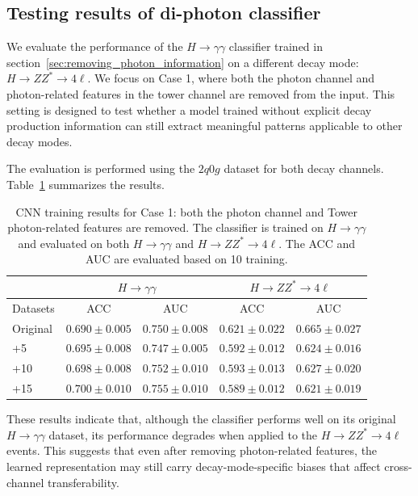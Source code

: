 \documentclass[12pt]{article}
\begin{document}
    \subsection{Testing results of di-photon classifier}%
    \label{sub:testing_results_of_di_photon_classifier}
        We evaluate the performance of the $H \to \gamma\gamma$ classifier trained in section~\ref{sec:removing_photon_information} on a different decay mode: $H \to ZZ^* \to 4\ell$. We focus on Case 1, where both the photon channel and photon-related features in the tower channel are removed from the input. This setting is designed to test whether a model trained without explicit decay production information can still extract meaningful patterns applicable to other decay modes.

        The evaluation is performed using the $2q0g$ dataset for both decay channels. Table~\ref{tab:CWoLa_CNN_training_results_3000_jet_tagging_eta_phi_aug_5_10_15_remove_photon_ZZ4l} summarizes the results.
        \begin{table}[htpb]
            \centering
            \caption{CNN training results for Case 1: both the photon channel and Tower photon-related features are removed. The classifier is trained on $H \to \gamma\gamma$ and evaluated on both $H \to \gamma\gamma$ and $H \to ZZ^* \to 4\ell$. The ACC and AUC are evaluated based on 10 training.}
            \label{tab:CWoLa_CNN_training_results_3000_jet_tagging_eta_phi_aug_5_10_15_remove_photon_ZZ4l}
            \begin{tabular}{l|cc|cc}
                         & \multicolumn{2}{c|}{$H\to\gamma\gamma$}      & \multicolumn{2}{c}{$H\to ZZ^*\to 4\ell$}           \\ \hline
                Datasets & ACC               & AUC               & ACC               & AUC               \\ \hline
                Original & $0.690 \pm 0.005$ & $0.750 \pm 0.008$ & $0.621 \pm 0.022$ & $0.665 \pm 0.027$ \\
                +5       & $0.695 \pm 0.008$ & $0.747 \pm 0.005$ & $0.592 \pm 0.012$ & $0.624 \pm 0.016$ \\
                +10      & $0.698 \pm 0.008$ & $0.752 \pm 0.010$ & $0.593 \pm 0.013$ & $0.627 \pm 0.020$ \\
                +15      & $0.700 \pm 0.010$ & $0.755 \pm 0.010$ & $0.589 \pm 0.012$ & $0.621 \pm 0.019$
            \end{tabular}
        \end{table}
        These results indicate that, although the classifier performs well on its original $H \to \gamma\gamma$ dataset, its performance degrades when applied to the $ H\to ZZ^* \to 4\ell$ events. This suggests that even after removing photon-related features, the learned representation may still carry decay-mode-specific biases that affect cross-channel transferability.
\end{document}
